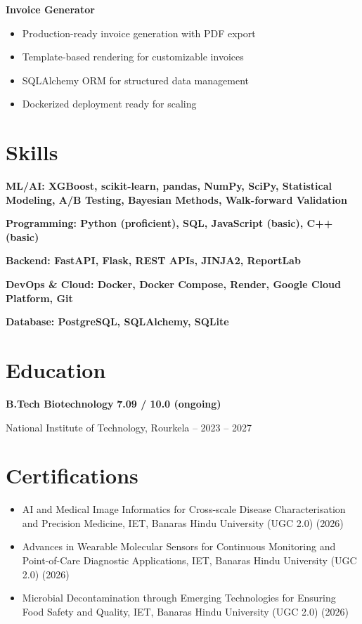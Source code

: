 \documentclass[11pt,a4paper]{article}
\begin{document}
\noindent\textbf{Invoice Generator} \hfill \href{https://github.com/jiyanshusingh/invoice-generator}{\faGithub}
\begin{itemize}
    \item Production-ready invoice generation with PDF export
    \item Template-based rendering for customizable invoices
    \item SQLAlchemy ORM for structured data management
    \item Dockerized deployment ready for scaling
\end{itemize}

\section*{Skills}
\noindent\textbf{ML/AI: XGBoost, scikit-learn, pandas, NumPy, SciPy, Statistical Modeling, A/B Testing, Bayesian Methods, Walk-forward Validation}

\noindent\textbf{Programming: Python (proficient), SQL, JavaScript (basic), C++ (basic)}

\noindent\textbf{Backend: FastAPI, Flask, REST APIs, JINJA2, ReportLab}

\noindent\textbf{DevOps \& Cloud: Docker, Docker Compose, Render, Google Cloud Platform, Git}

\noindent\textbf{Database: PostgreSQL, SQLAlchemy, SQLite}

\section*{Education}
\noindent\textbf{B.Tech Biotechnology} \hfill \textbf{7.09 / 10.0 (ongoing)}

\noindent National Institute of Technology, Rourkela -- 2023 – 2027

\section*{Certifications}
\begin{itemize}
    \item AI and Medical Image Informatics for Cross-scale Disease Characterisation and Precision Medicine, IET, Banaras Hindu University (UGC 2.0) (2026)
    \item Advances in Wearable Molecular Sensors for Continuous Monitoring and Point-of-Care Diagnostic Applications, IET, Banaras Hindu University (UGC 2.0) (2026)
    \item Microbial Decontamination through Emerging Technologies for Ensuring Food Safety and Quality, IET, Banaras Hindu University (UGC 2.0) (2026)
\end{itemize}
\end{document}
